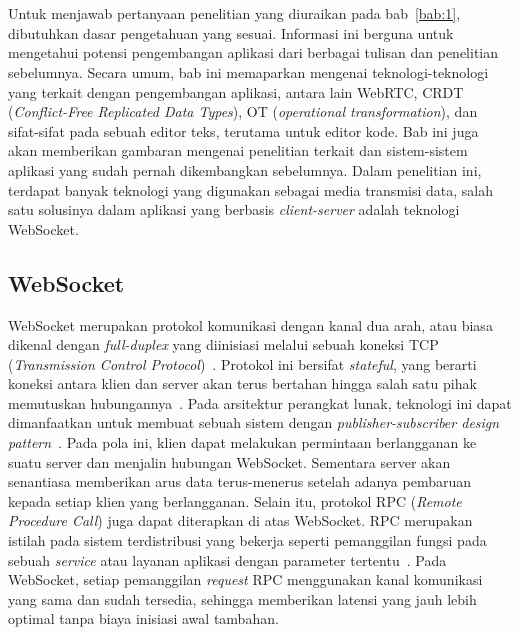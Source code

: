 \chapter{\babDua}
\label{bab:2}
Untuk menjawab pertanyaan penelitian yang diuraikan pada bab~\ref{bab:1}, dibutuhkan dasar pengetahuan yang sesuai. Informasi ini berguna untuk mengetahui potensi pengembangan aplikasi dari berbagai tulisan dan penelitian sebelumnya. Secara umum, bab ini memaparkan mengenai teknologi-teknologi yang terkait dengan pengembangan aplikasi, antara lain WebRTC, CRDT (\textit{Conflict-Free Replicated Data Types}), OT (\textit{operational transformation}), dan sifat-sifat pada sebuah editor teks, terutama untuk editor kode. Bab ini juga akan memberikan gambaran mengenai penelitian terkait dan sistem-sistem aplikasi yang sudah pernah dikembangkan sebelumnya. Dalam penelitian ini, terdapat banyak teknologi yang digunakan sebagai media transmisi data, salah satu solusinya dalam aplikasi yang berbasis \textit{client-server} adalah teknologi WebSocket.

\section{WebSocket}

WebSocket merupakan protokol komunikasi dengan kanal dua arah, atau biasa dikenal dengan \textit{full-duplex} yang diinisiasi melalui sebuah koneksi TCP (\textit{Transmission Control Protocol})~\citep{fette2011websocket}. Protokol ini bersifat \textit{stateful}, yang berarti koneksi antara klien dan server akan terus bertahan hingga salah satu pihak memutuskan hubungannya~\citep{pimentel2012communicating}. Pada arsitektur perangkat lunak, teknologi ini dapat dimanfaatkan untuk membuat sebuah sistem dengan \textit{publisher-subscriber design pattern}~\citep{ganaputra2015asynchronous}. Pada pola ini, klien dapat melakukan permintaan berlangganan ke suatu server dan menjalin hubungan WebSocket. Sementara server akan senantiasa memberikan arus data terus-menerus setelah adanya pembaruan kepada setiap klien yang berlangganan. Selain itu, protokol RPC (\textit{Remote Procedure Call}) juga dapat diterapkan di atas WebSocket. RPC merupakan istilah pada sistem terdistribusi yang bekerja seperti pemanggilan fungsi pada sebuah \textit{service} atau layanan aplikasi dengan parameter tertentu~\citep{srinivasan1995rpc}. Pada WebSocket, setiap pemanggilan \textit{request} RPC menggunakan kanal komunikasi yang sama dan sudah tersedia, sehingga memberikan latensi yang jauh lebih optimal tanpa biaya inisiasi awal tambahan.


